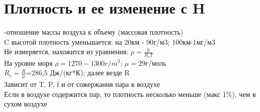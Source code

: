 
\section{Плотность и ее изменение с H}
-отношение массы воздуха к объему (массовая плотность)\\
C  высотой плотность уменьшается: на 20км - 90г/м3; 100км-1мг/м3\\
Не измеряется, нахожится из уравнения: $\rho=\frac{p}{R_cT}$\\
На уровне моря $\rho=1270-1300 r/m^3$; $\mu=29$г/моль\\
$R_c=\frac{R}{\mu}$=286,5 Дж/(кг*К); далее везде R\\
Зависит от T, P, f и от сожержания пара в воздухе\\
Если в воздухе содержится пар, то плотность несколько меньше (макс 1\%), чем в сухом воздухе
